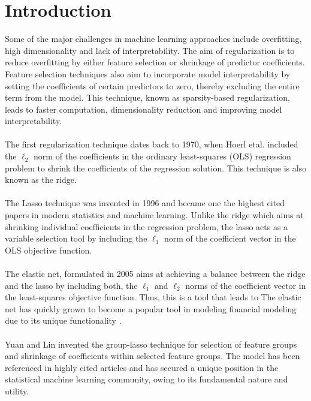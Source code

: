 \documentclass[a4paper,12pt]{article}
\begin{document}
	\section{Introduction}
	Some of the major challenges in machine learning approaches include overfitting, high dimensionality and lack of interpretability. The aim of regularization is to reduce overfitting by either feature selection or shrinkage of predictor coefficients. Feature selection techniques also aim to incorporate model interpretability by setting the coefficients of certain predictors to zero, thereby excluding the entire term from the model. This technique, known as sparsity-based regularization, leads to faster computation, dimensionality reduction and improving model interpretability. \\
\\
The first regularization technique dates back to 1970, when Hoerl etal.\cite{hoerl1970ridge} included the $\ell_2$ norm of the coefficients in the ordinary least-squares (OLS) regression problem to shrink the coefficients of the regression solution. This technique is also known as the ridge.
\\\\
The Lasso\cite{tibshirani1996regression} technique was invented in 1996 and became one the highest cited papers in modern statistics and machine learning. Unlike the ridge which aims at shrinking individual coefficients in the regression problem, the lasso acts as a variable selection tool by including the $\ell_1$ norm of the coefficient vector in the OLS objective function. \\\\
The elastic net, formulated in 2005 \cite{zou2005regularization} aims at achieving a balance between the ridge and the lasso by including both, the $\ell_1$ and $\ell_2$ norms of the coefficient vector in the least-squares objective function. Thus, this is a tool that leads to  The elastic net has quickly grown to become a popular tool in modeling financial modeling due to its unique functionality \cite{kim2014forecasting}.\\ \\
Yuan and Lin \cite{yuan2006model} invented the group-lasso technique for selection of feature groups and shrinkage of coefficients within selected feature groups. The model has been referenced in highly cited articles \cite{hastie2009unsupervised,boyd2011distributed} and has secured a unique position in the statistical machine learning community, owing to its fundamental nature and utility. \\\\
\end{document}
